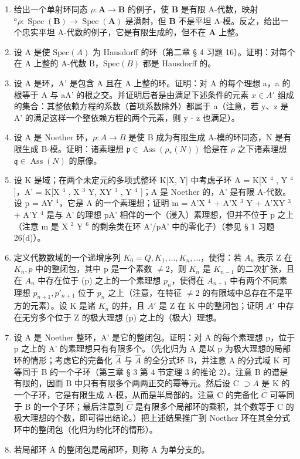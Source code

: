 
\begin{enumerate}
\def\labelenumi{\arabic{enumi}.}
\item
  给出一个单射环同态 \(\rho: \mathbf{A} \to \mathbf{B}\) 的例子，使 \(\mathbf{B}\) 是有限 A-代数，映射 \(^a\rho: \operatorname{Spec}(\mathbf{B}) \to \operatorname{Spec}(\mathbf{A})\) 是满射，但 \(\mathbf{B}\) 不是平坦 A-模。反之，给出一个忠实平坦 A-代数的例子，它是有限生成的，但不在 \(\mathbf{A}\) 上整。
\item
  设 A 是使 \(\text{Spec}(A)\) 为 Hausdorff 的环（第二章 § 4 习题 16）。证明：对每个在 A 上整的 A-代数 B，\(\text{Spec}(B)\) 都是 Hausdorff 的。
\item
  设 A 是环，A' 是包含 A 且在 A 上整的环。证明：对 A 的每个理想 a，a 的根等于 A 与 aA' 的根之交。并证明后者是由满足下述条件的元素 \(x \in A'\) 组成的集合：其整依赖方程的系数（首项系数除外）都属于 a（注意，若 y、z 是 A' 的满足这样一个整依赖方程的两个元素，则 y - z 也满足）。
\item
  设 A 是 Noether 环，\(\rho: A \to B\) 是使 B 成为有限生成 A-模的环同态，N 是有限生成 B-模。证明：诸素理想 \(\mathfrak{p} \in \operatorname{Ass}(\rho_{*}(N))\) 恰是在 \(\rho\) 之下诸素理想 \(\mathfrak{q} \in \operatorname{Ass}(N)\) 的原像。
\item
  设 K 是域；在两个未定元的多项式整环 K{[}X, Y{]} 中考虑子环 A = K{[}X \(^{4}\) , Y \(^{4}\) {]}，A' = K{[}X \(^{4}\) , X \(^{3}\) Y, XY \(^{3}\) , Y \(^{4}\) {]}；A 是 Noether 的，A' 是有限 A-代数。设 p = AY \(^{4}\)，它是 A 的一个素理想；证明 m = A'X \(^{4}\) + A'X \(^{3}\) Y + A'XY \(^{3}\) + A'Y \(^{4}\) 是与 A' 的理想 pA' 相伴的一个（浸入）素理想，但并不位于 p 之上（注意 m 是 X \(^{2}\) Y \(^{6}\) 的剩余类在环 A'/pA' 中的零化子）（参见 § 1 习题 26(d)）。
\item
  定义代数数域的一个递增序列 \(K_{0} = Q, K_{1}, \ldots, K_{n}, \ldots\)，使得：若 \(A_{n}\) 表示 Z 在 \(K_{n}, p\) 中的整闭包，其中 p 是一个素数 \(\neq 2\)，则 \(K_{n}\) 是 \(K_{n-1}\) 的二次扩张，且在 \(A_{n}\) 中存在位于 (p) 之上的一个素理想 \(p_{n}\)，使得在 \(A_{n+1}\) 中有两个不同素理想 \(p_{n+1}, p'_{n+1}\) 位于 \(p_{n}\) 之上（注意，在特征 \(\neq 2\) 的有限域中总存在不是平方的元素）。设 K 是诸 \(K_{n}\) 的并，且 \(A'\) 是 Z 在 K 中的整闭包；证明 \(A'\) 中存在无穷多个位于 Z 的极大理想 (p) 之上的（极大）理想。
\item
  设 A 是 Noether 整环，A' 是它的整闭包。证明：对 A 的每个素理想 p，位于 p 之上的 A' 的素理想只有有限多个。（先化归为 A 是以 p 为极大理想的局部环的情形；考虑它的完备化 \(\hat{A}\) 与 \(\hat{A}\) 的全分式环 B，并注意 A 的分式域 K 可等同于 B 的一个子环（第三章 § 3 第 4 节定理 3 的推论 2）。注意 B 的谱是有限的，因而 B 中只有有限多个两两正交的幂等元。然后设 C \(\supset A\) 是 K 的一个子环，它是有限生成 A-模，从而是半局部的。注意 C 的完备化 \(\hat{C}\) 可等同于 B 的一个子环；最后注意到 \(\hat{C}\) 是有限多个局部环的乘积，其个数等于 C 的极大理想的个数，即可得出结论。）把上述结果推广到 Noether 环在其全分式环中的整闭包（化归为约化环的情形）。
\item
  若局部环 A 的整闭包是局部环，则称 A 为单分支的。
\end{enumerate}

